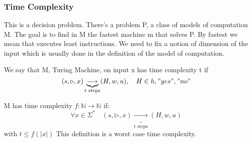 \subsubsection*{Time Complexity}
This is a decision problem. There's a problem P, a class of models of computation M. The goal is to find in M the fastest machine m that solves P. By fastest we mean that executes least instructions. We need to fix a notion of dimension of the input which is usually done in the definition of the model of computation.\\
\begin{definition}
    We say that M, Turing Machine, on input x has time complexity t if 
    \[ 
        (s,\triangleright, x) \underbrace{\longrightarrow}_{\text{t steps}} (H, w, u), \quad H\in {h,"yes","no"}
    \]
\end{definition}
\begin{definition}
    M has time complexity $f: \mathbb{N}\longrightarrow\mathbb{N}$ if:
    \[ 
        \forall x \in \Sigma^*\quad (s,\triangleright, x)\underbrace{\longrightarrow}_{\text{t steps}}(H,w,u) 
    \]
    with $t\leq f(|x|)$
    This definition is a worst case time complexity. 
\end{definition}
